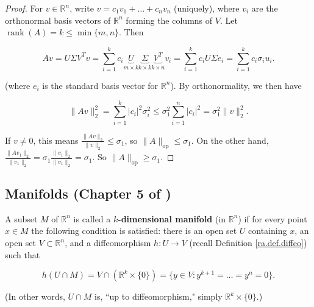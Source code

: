 \begin{proof}

For \(v \in \mathbb{R}^n\), write \(v= c_1 v_1 + \ldots + c_n v_n\) (uniquely), where \(v_i\) are the orthonormal basis vectors of \(\mathbb{R}^n\) forming the columns of \(V\). Let \(\operatorname{rank}(A) = k \leq \min \{m,n\}\). Then

\[
Av = U \Sigma V^Tv = \sum_{i=1}^k c_i \underbrace{U}_{m \times k} \underbrace{\Sigma}_{k \times k} \underbrace{V^T}_{k \times n} v_i  = \sum_{i=1}^k c_i U \Sigma e_i =  \sum_{i=1}^k c_i \sigma_i u_i .
\]

(where \(e_i\) is the standard basis vector for \(\mathbb{R}^n\)). By orthonormality, we then have 

\[
\lVert A v \rVert_2^2 = \sum_{i=1}^k |c_i|^2 \sigma_i^2  \leq  \sigma_1^2 \sum_{i=1}^n   |c_i|^2  =  \sigma_1^2  \lVert v \rVert_2^2.
\]

If \(v \neq 0\), this means \( \frac{\lVert A v \rVert_2}{ \lVert v \rVert_2} \leq \sigma_1\), so \(\lVert A \rVert_{\text{op}} \leq \sigma_1\). On the other hand, \( \frac{\lVert A v_1 \rVert_2}{ \lVert v_1 \rVert_2} = \sigma_1 \frac{ \lVert v_1 \rVert_2}{\lVert v_1 \rVert_2} = \sigma_1\). So \(\lVert A \rVert_{\text{op}} \geq  \sigma_1\).

\end{proof}



\subsection{Manifolds (Chapter 5 of \citet{spivak1971calculus})}

\begin{definition}\label{ra.def.manifold}

A subset \(M\) of \(\mathbb{R}^n\) is called a \textbf{\(k\)-dimensional manifold} (in \(\mathbb{R}^n\)) if for every point \(x \in M\) the following condition is satisfied: there is an open set \(U\) containing \(x\), an open set \(V \subset \mathbb{R}^n\), and a diffeomorphism \(h: U \to V\) (recall Definition \ref{ra.def.diffeo}) such that 

\[
h(U \cap M) = V \cap( \mathbb{R}^k \times \{0\}) = \{y \in V: y^{k+1} = \ldots =y^n = 0\}.
\]

(In other words, \(U \cap M\) is, ``up to diffeomorphism," simply \(\mathbb{R}^k \times \{0\}\).)

\end{definition}

